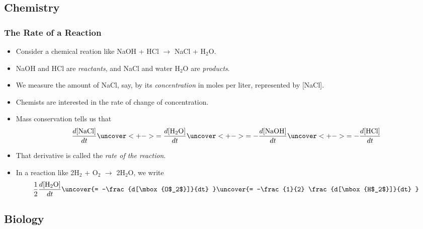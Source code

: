 \documentclass[serif,ignorenonframetext]{beamer}
\begin{document}
\subsection{Chemistry}

\begin{frame}
  \frametitle{The Rate of a Reaction}
  \begin{itemize}[<+->]
  \item Consider a chemical reation like NaOH + HCl $\to$ NaCl + H$_2$O.
  \item NaOH and HCl are \textit{reactants}, 
    and NaCl and water H$_2$O are \textit{products}.
  \item We measure the amount of NaCl, say, by its
    \textit{concentration} in moles per liter,
    represented by [NaCl].
  \item Chemists are interested in the rate of change of concentration.
  \item Mass conservation tells us that
    \begin{align*}
      \frac{d[\mbox{NaCl}]}{dt} 
      \uncover<+->{= \frac{d[\mbox{H$_2$O}]}{dt} }%
      \uncover<+->{= -\frac{d[\mbox{NaOH}]}{dt} }%
      \uncover<+->{= -\frac{d[\mbox{HCl}]}{dt} }%
    \end{align*}
  \item That derivative is called the \textit{rate of the reaction}.
  \item In a reaction like 2H$_2$ + O$_2$ $\to$ 2H$_2$O, we write
    \begin{align*}
      \frac{1}{2} \frac{d[\mbox{H$_2$O}]}{dt} 
      \uncover{= -\frac{d[\mbox{O$_2$}]}{dt} }%
      \uncover{= -\frac{1}{2} \frac{d[\mbox{H$_2$}]}{dt} }%
    \end{align*}
  \end{itemize}
\end{frame}


\subsection{Biology}
\end{document}
